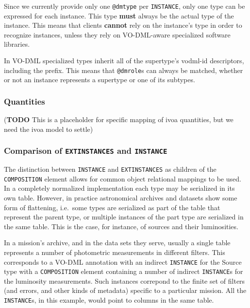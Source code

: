 \documentclass[11pt,a4paper]{ivoa}
\begin{document}
Since we currently provide only one \texttt{@dmtype} per
\texttt{INSTANCE}, only one type can be expressed for each instance.
This type \textbf{must} always be the actual type of the instance. This
means that clients \textbf{cannot} rely on the instance's type in order
to recognize instances, unless they rely on VO-DML-aware specialized
software libraries.

In VO-DML specialized types inherit all of the supertype's vodml-id
descriptors, including the prefix. This means that \texttt{@dmrole}s can
always be matched, whether or not an instance represents a supertype or
one of its subtypes.

\subsubsection{Quantities}\label{quantities}

(\textbf{TODO} This is a placeholder for specific mapping of ivoa
quantities, but we need the ivoa model to settle)

\subsubsection{Comparison of \texttt{EXTINSTANCES} and
\texttt{INSTANCE}}\label{comparison-of-extinstances-and-instance}

The distinction between \texttt{INSTANCE} and \texttt{EXTINSTANCES} as
children of the \texttt{COMPOSITION} element allows for common object
relational mappings to be used. In a completely normalized
implementation each type may be serialized in its own table. However, in
practice astronomical archives and datasets show some form of
flattening, i.e.~some types are serialized as part of the table that
represent the parent type, or multiple instances of the part type are
serialized in the same table. This is the case, for instance, of sources
and their luminosities.

In a mission's archive, and in the data sets they serve, usually a
single table represents a number of photometric measurements in
different filters. This corresponds to a VO-DML annotation with an
indirect \texttt{INSTANCE} for the Source type with a
\texttt{COMPOSITION} element containing a number of indirect
\texttt{INSTANCE}s for the luminosity measurements. Such instances
correpond to the finite set of filters (and errors, and other kinds of
metadata) specific to a particular mission. All the \texttt{INSTANCE}s,
in this example, would point to columns in the same table.
\end{document}

